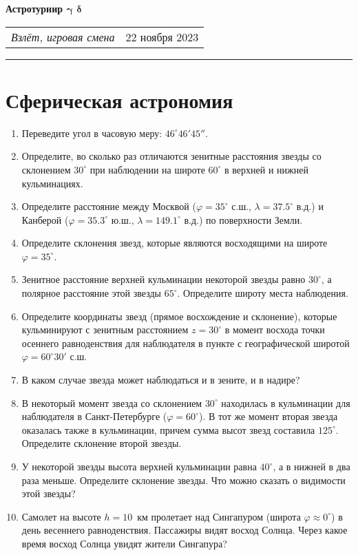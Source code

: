 \documentclass[12pt]{article}
\begin{document}
\begin{center}
	\textbf{\LARGE{Астротурнир $\mathbf{\gamma}$ $\mathbf{\delta}$}}
\end{center}
\begin{tabularx}{\textwidth}{Xr}
	{\textit{Взлёт, игровая смена}} & $22$ ноября $2023$ \\
\end{tabularx}

\noindent\rule{\textwidth}{0.4pt}

\section*{Сферическая астрономия}
\begin{enumerate}
	\item Переведите угол в часовую меру: $46^{\circ} 46' 45''$.
    \item Определите, во сколько раз отличаются зенитные расстояния звезды со склонением $30^{\circ}$ при наблюдении на широте $60^{\circ}$ в верхней и нижней кульминациях.
    \item Определите расстояние между Москвой ($\varphi = 35^{\circ}$ с.ш., $\lambda = 37.5^{\circ}$ в.д.) и Канберой ($\varphi = 35.3^{\circ}$ ю.ш., $\lambda = 149.1^{\circ}$ в.д.) по поверхности Земли.
    \item Определите склонения звезд, которые являются восходящими на широте $\varphi = 35^{\circ}$.
    \item Зенитное расстояние верхней кульминации некоторой звезды равно $30^{\circ}$, а полярное расстояние этой звезды $65^{\circ}$. Определите широту места наблюдения.
    \item Определите координаты звезд (прямое восхождение и склонение), которые кульминируют с зенитным расстоянием $z = 30^{\circ}$ в момент восхода точки осеннего равноденствия для наблюдателя в пункте с географической широтой $\varphi = 60^{\circ} 30'$ с.ш.
    \item В каком случае звезда может наблюдаться и в зените, и в надире?
    \item В некоторый момент звезда со склонением $30^{\circ}$ находилась в кульминации для наблюдателя в Санкт-Петербурге ($\varphi = 60^{\circ}$). В тот же момент вторая звезда оказалась также в кульминации, причем сумма высот звезд составила $125^{\circ}$. Определите склонение второй звезды.
    \item У некоторой звезды высота верхней кульминации равна $40^{\circ}$, а в нижней в два раза меньше. Определите склонение звезды. Что можно сказать о видимости этой звезды?
    \item Самолет на высоте $h=10$~км пролетает над Сингапуром (широта $\varphi \approx 0^{\circ}$) в день весеннего равноденствия. Пассажиры видят восход Солнца. Через какое время восход Солнца увидят жители Сингапура?
\end{enumerate}
\end{document}

